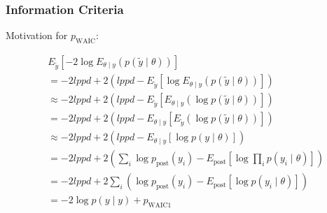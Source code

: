 \documentclass{beamer}
\begin{document}
\begin{frame}
\frametitle{Information Criteria}

Motivation for $p_{\text{WAIC}}$:

\begin{align*}
&E_{\tilde{y}}\left[ -2  \log  E_{\theta \mid y} ( p(\tilde{y} \mid \theta) ) \right] \\
&= - 2 lppd + 2\left( lppd - E_{\tilde{y}}\left[  \log  E_{\theta \mid y} ( p(\tilde{y} \mid \theta) ) \right] \right) \\
&\approx - 2 lppd + 2\left( lppd - E_{\tilde{y}}\left[   E_{\theta \mid y} ( \log  p(\tilde{y} \mid \theta) ) \right] \right) \\
&= - 2 lppd + 2\left( lppd - E_{\theta \mid y}\left[   E_{\tilde{y}} (\log  p(\tilde{y} \mid \theta) ) \right] \right) \\
&\approx - 2 lppd + 2\left( lppd - E_{\theta \mid y}\left[  \log   p(y \mid \theta)  \right] \right) \\
&= - 2 lppd + 2\left( \sum_i \log p_{\text{post}}(y_i) - E_{\text{post}}\left[  \log   \prod_i p(y_i \mid \theta)  \right] \right) \\
&= - 2 lppd + 2 \sum_i \left(  \log p_{\text{post}}(y_i) - E_{\text{post}}\left[ \log p(y_i \mid \theta)  \right] \right) \\
&= - 2\log p(y \mid y) + p_{\text{WAIC} 1}
\end{align*}



\end{frame}
\end{document}
